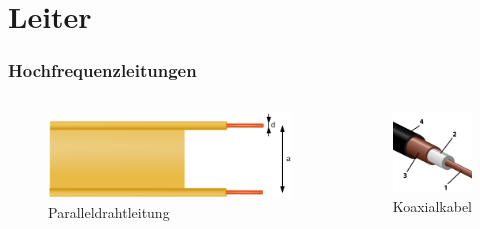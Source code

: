 \section*{Leiter}
\begin{frame}
\frametitle{Hochfrequenzleitungen}
\begin{center}
  \begin{columns}
      \begin{center}
	\begin{figure}
	\includegraphics[width=1\textwidth,height=.5\textwidth,keepaspectratio]{e10/parallel.png}
	\caption{Paralleldrahtleitung\cite{parallel}}
      \end{figure}
      \end{center}
      \begin{center}
	\begin{figure}
	\includegraphics[width=1\textwidth,height=.5\textwidth,keepaspectratio]{e10/coax.png}
	\caption{Koaxialkabel\cite{coax}}
      \end{figure}
      \end{center}
  \end{columns}
\end{center}
\end{frame}

